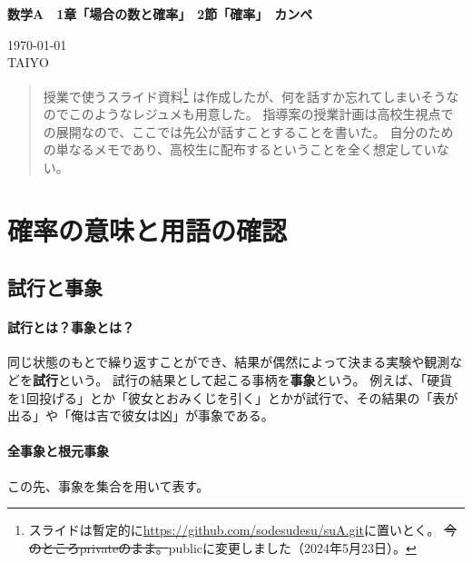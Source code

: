 \documentclass[12pt]{ltjsarticle}\usepackage{ifthen}\newcounter{enlarge}\setcounter{enlarge}{1}
\newcommand{\LS}[2]{\ifthenelse{\value{enlarge}=2 \OR \value{enlarge}=3}{#1}{#2}}
\newcommand{\LO}[1]{\LS{#1}{\relax}}
\begin{document}
{\Large%
\noindent
\textbf{%
数学A　1章「場合の数と確率」　2節「確率」　カンペ
\LO{\\ \color{teal} 〈拡大版〉}}
}

\begin{flushleft}
\today \\
TAIYO
\end{flushleft}

\begin{quotation}
授業で使うスライド資料\footnote{%
  スライドは暫定的に\url{https://github.com/sodesudesu/suA.git}に置いとく。
  \sout{今のところprivateのまま。}publicに変更しました（2024年5月23日）。
}
は作成したが、何を話すか忘れてしまいそうなのでこのようなレジュメも用意した。
指導案の授業計画は高校生視点での展開なので、ここでは先公が話すことすることを書いた。
自分のための単なるメモであり、高校生に配布するということを全く想定していない。
\end{quotation}

\section{確率の意味と用語の確認}

\subsection{試行と事象} \label{ss:1.1}

\paragraph{試行とは？事象とは？}

同じ状態のもとで繰り返すことができ、結果が偶然によって決まる実験や観測などを\textbf{試行}という。
試行の結果として起こる事柄を\textbf{事象}という。
例えば、「硬貨を1回投げる」とか「彼女とおみくじを引く」とかが試行で、その結果の「表が出る」や「俺は吉で彼女は凶」が事象である。

\paragraph{全事象と根元事象}

この先、事象を集合を用いて表す。
\end{document}
